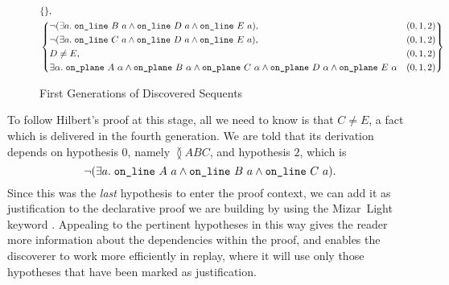 \begin{figure}[H]
{\begin{minipage}{\linewidth}
\begin{displaymath}
\begin{split}
      &\{\},\\
    &\left\{\begin{aligned}
        &\Triangle{a}{B}{D}{E}, & (0,1,2)\\
        &\Triangle{a}{C}{D}{E}, & (0,1,2)\\
        &D\neq E, & (0,1,2)\\
      &\exists \alpha.\;\code{on\_plane}\ A\ \alpha\wedge \code{on\_plane}\ B\ \alpha\wedge \code{on\_plane}\ C\ \alpha\wedge\code{on\_plane}\ D\ \alpha\wedge\code{on\_plane}\ E\ \alpha & (0,1,2)
    \end{aligned}\right\}\\
\end{split}
\end{displaymath}
\end{minipage}}
\caption{First Generations of Discovered Sequents}
\label{fig:FirstGenerations}
\end{figure}

To follow Hilbert's proof at this stage, all we need to know is that $C\neq E$, a fact which is delivered in the fourth generation. We are told that its derivation depends on hypothesis $0$, namely $\between{A}{B}{C}$, and hypothesis $2$, which is 
\begin{displaymath}
\neg(\exists a.\; \texttt{on\_line}\ A\ a\wedge \texttt{on\_line}\ B\ a\wedge \texttt{on\_line}\ C\ a).
\end{displaymath}
Since this was the \emph{last} hypothesis to enter the proof context, we can add it as justification to the declarative proof we are building by using the Mizar~Light keyword . Appealing to the pertinent hypotheses in this way gives the reader more information about the dependencies within the proof, and enables the discoverer to work more efficiently in replay, where it will use only those hypotheses that have been marked as justification.

\linebreak

